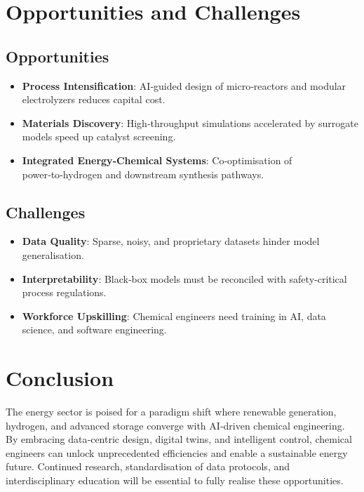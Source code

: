 \documentclass[conference]{IEEEtran}
\begin{document}
\section{Opportunities and Challenges}
\subsection{Opportunities}
\begin{itemize}
  \item \textbf{Process Intensification}: AI‑guided design of micro‑reactors and modular electrolyzers reduces capital cost.
  \item \textbf{Materials Discovery}: High‑throughput simulations accelerated by surrogate models speed up catalyst screening.
  \item \textbf{Integrated Energy‑Chemical Systems}: Co‑optimisation of power‑to‑hydrogen and downstream synthesis pathways.
\end{itemize}

\subsection{Challenges}
\begin{itemize}
  \item \textbf{Data Quality}: Sparse, noisy, and proprietary datasets hinder model generalisation.
  \item \textbf{Interpretability}: Black‑box models must be reconciled with safety‑critical process regulations.
  \item \textbf{Workforce Upskilling}: Chemical engineers need training in AI, data science, and software engineering.
\end{itemize}

\section{Conclusion}
The energy sector is poised for a paradigm shift where renewable generation, hydrogen, and advanced storage converge with AI‑driven chemical engineering.  By embracing data‑centric design, digital twins, and intelligent control, chemical engineers can unlock unprecedented efficiencies and enable a sustainable energy future.  Continued research, standardisation of data protocols, and interdisciplinary education will be essential to fully realise these opportunities.
\end{document}
